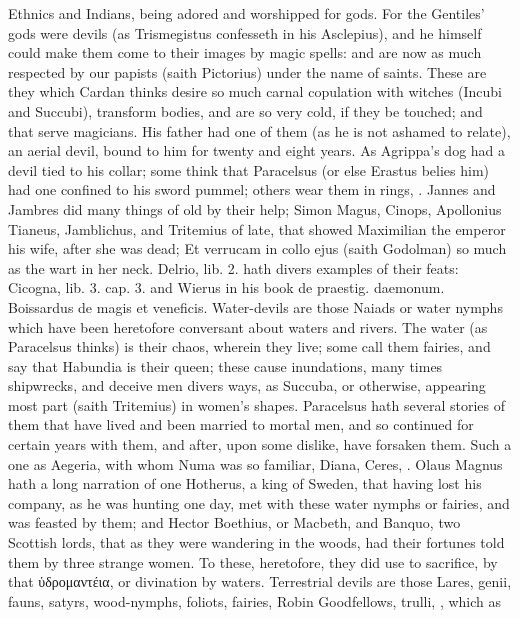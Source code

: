 {Ethnics and Indians, being adored and worshipped for  gods. For
the Gentiles' gods were devils (as Trismegistus confesseth in his
Asclepius), and he himself could make them come to their images by
magic spells: and are now as much respected by our papists (saith
 Pictorius) under the name of saints. These are they which Cardan
thinks desire so much carnal copulation with witches (Incubi and
Succubi), transform bodies, and are so very cold, if they be touched;
and that serve magicians. His father had one of them (as he is not
ashamed to relate), an aerial devil, bound to him for twenty and
eight years. As Agrippa's dog had a devil tied to his collar; some
think that Paracelsus (or else Erastus belies him) had one confined to
his sword pummel; others wear them in rings, \etc{}. Jannes and Jambres did
many things of old by their help; Simon Magus, Cinops, Apollonius
Tianeus, Jamblichus, and Tritemius of late, that showed Maximilian the
emperor his wife, after she was dead; Et verrucam in collo ejus (saith
Godolman) so much as the wart in her neck. Delrio, lib. 2. hath
divers examples of their feats: Cicogna, lib. 3. cap. 3. and Wierus in
his book de praestig. daemonum. Boissardus de magis et veneficis.
Water-devils are those Naiads or water nymphs which have been
heretofore conversant about waters and rivers. The water (as Paracelsus
thinks) is their chaos, wherein they live; some call them fairies, and
say that Habundia is their queen; these cause inundations, many times
shipwrecks, and deceive men divers ways, as Succuba, or otherwise,
appearing most part (saith Tritemius) in women's shapes.
Paracelsus hath several stories of them that have lived and been
married to mortal men, and so continued for certain years with them,
and after, upon some dislike, have forsaken them. Such a one as
Aegeria, with whom Numa was so familiar, Diana, Ceres, \etc{}. Olaus
Magnus hath a long narration of one Hotherus, a king of Sweden, that
having lost his company, as he was hunting one day, met with these
water nymphs or fairies, and was feasted by them; and Hector Boethius,
or Macbeth, and Banquo, two Scottish lords, that as they were wandering
in the woods, had their fortunes told them by three strange women. To
these, heretofore, they did use to sacrifice, by that ὑδρομαντέια, or
divination by waters.
Terrestrial devils are those Lares, genii, fauns, satyrs, 
wood-nymphs, foliots, fairies, Robin Goodfellows, trulli, \etc{}, which as
}
